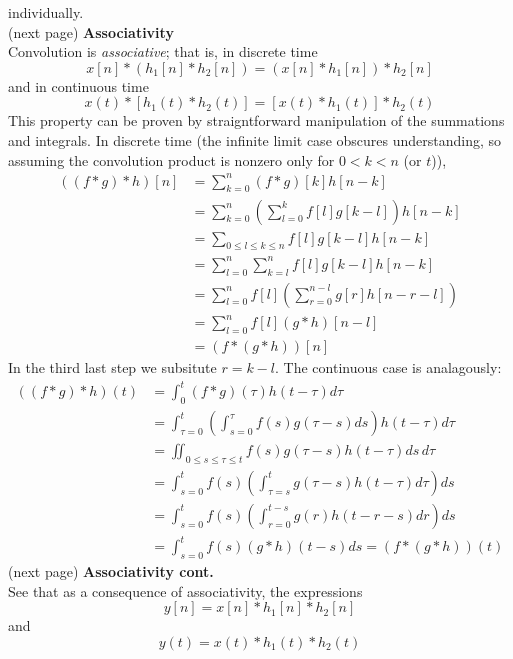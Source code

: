 \documentclass{report}
\begin{document}
individually.\\
(next page)\newpage
\noindent\textbf{Associativity}\\
Convolution is \textit{associative}; that is, in discrete time
\begin{equation*}
x[n]*(h_1[n]*h_2[n])=(x[n]*h_1[n])*h_2[n]
\end{equation*}
and in continuous time
\begin{equation*}
x(t)*[h_1(t)*h_2(t)]=[x(t)*h_1(t)]*h_2(t)
\end{equation*}
This property can be proven by straigntforward manipulation of the summations and integrals. In discrete time (the infinite limit
case obscures understanding, so assuming the convolution product is nonzero only for $0<k<n$ (or $t$)),
\begin{align*}
((f*g)*h)[n]&=\sum^{n}_{k=0}(f*g)[k]h[n-k]\\
&=\sum^{n}_{k=0}\left(\sum^k_{l=0}f[l]g[k-l]\right)h[n-k]\\
&=\sum_{0\leq l\leq k\leq n}f[l]g[k-l]h[n-k]\\
&=\sum^n_{l=0}\sum^n_{k=l}f[l]g[k-l]h[n-k]\\
&=\sum^n_{l=0}f[l]\left(\sum^{n-l}_{r=0}g[r]h[n-r-l]\right)\\
&=\sum^n_{l=0}f[l](g*h)[n-l]\\
&=(f*(g*h))[n]
\end{align*}
In the third last step we subsitute $r=k-l$. The continuous case is analagously:
\begin{align*}
((f*g)*h)(t)&=\int^t_{0}(f*g)(\tau)h(t-\tau)d\tau\\
&=\int^t_{\tau=0}\left(\int^\tau_{s=0}f(s)g(\tau-s)ds\right)h(t-\tau)d\tau\\
&=\iint_{0\leq s\leq\tau\leq t}f(s)g(\tau-s)h(t-\tau)ds\,d\tau\\
&=\int^t_{s=0}f(s)\left(\int^t_{\tau=s}g(\tau-s)h(t-\tau)d\tau\right)ds\\
&=\int^t_{s=0}f(s)\left(\int^{t-s}_{r=0}g(r)h(t-r-s)dr\right)ds\\
&=\int^t_{s=0}f(s)(g*h)(t-s)ds=(f*(g*h))(t)
\end{align*}
(next page)\newpage
\noindent\textbf{Associativity cont.}\\
See that as a consequence of associativity, the expressions
\begin{equation*}
y[n]=x[n]*h_1[n]*h_2[n]
\end{equation*}
and 
\begin{equation*}
y(t)=x(t)*h_1(t)*h_2(t)
\end{equation*}
\end{document}

